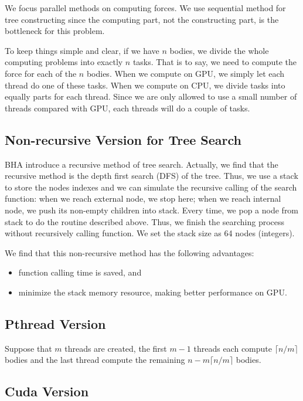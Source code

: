 \documentclass[11pt, a4paper]{article}
\begin{document}
We focus parallel methods on computing forces. We use sequential method for tree constructing since the computing part, not the constructing part, is the bottleneck for this problem.

To keep things simple and clear, if we have $n$ bodies, we divide the whole computing problems into exactly $n$ tasks. That is to say, we need to compute the force for each of the $n$ bodies. When we compute on GPU, we simply let each thread do one of these tasks. When we compute on CPU, we divide tasks into equally parts for each thread. Since we are only allowed to use a small number of threads compared with GPU, each threads will do a couple of tasks.

\subsection{Non-recursive Version for Tree Search}

BHA introduce a recursive method of tree search. Actually, we find that the recursive method is the depth first search (DFS) of the tree. Thus, we use a stack to store the nodes indexes and we can simulate the recursive calling of the search function: when we reach external node, we stop here; when we reach internal node, we push its non-empty children into stack. Every time, we pop a node from stack to do the routine described above. Thus, we finish the searching process without recursively calling function. We set the stack size as 64 nodes (integers).

We find that this non-recursive method has the following advantages:

\begin{itemize}
    \item function calling time is saved, and
    \item minimize the stack memory resource, making better performance on GPU.
\end{itemize}

\subsection{Pthread Version}

Suppose that $m$ threads are created, the first $m-1$ threads each compute $\lceil n/m \rceil$ bodies and the last thread compute the remaining $n - m\lceil n/m \rceil$ bodies.

\subsection{Cuda Version}
\end{document}
